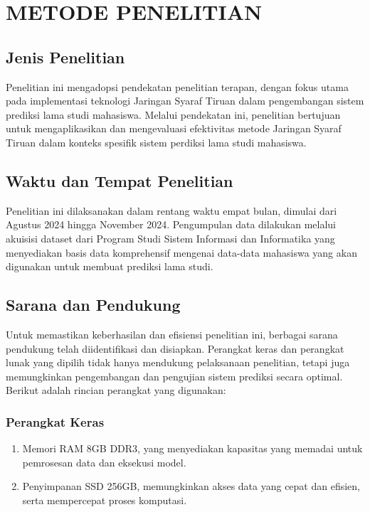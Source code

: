\chapter{METODE PENELITIAN}

\section{Jenis Penelitian}
Penelitian ini mengadopsi pendekatan penelitian terapan, dengan fokus utama pada implementasi teknologi Jaringan Syaraf Tiruan dalam pengembangan sistem prediksi lama studi mahasiswa. Melalui pendekatan ini, penelitian bertujuan untuk mengaplikasikan dan mengevaluasi efektivitas metode Jaringan Syaraf Tiruan dalam konteks spesifik sistem perdiksi lama studi mahasiswa.

\section{Waktu dan Tempat Penelitian}
Penelitian ini dilaksanakan dalam rentang waktu empat bulan, dimulai dari Agustus 2024 hingga November 2024. Pengumpulan data dilakukan melalui akuisisi dataset dari Program Studi Sistem Informasi dan Informatika yang menyediakan basis data komprehensif mengenai data-data mahasiswa yang akan digunakan untuk membuat prediksi lama studi.

\section{Sarana dan Pendukung}
Untuk memastikan keberhasilan dan efisiensi penelitian ini, berbagai sarana pendukung telah diidentifikasi dan disiapkan. Perangkat keras dan perangkat lunak yang dipilih tidak hanya mendukung pelaksanaan penelitian, tetapi juga memungkinkan pengembangan dan pengujian sistem prediksi secara optimal. Berikut adalah rincian perangkat yang digunakan:

\subsection{Perangkat Keras}
\begin{enumerate}
    \item Memori RAM 8GB DDR3, yang menyediakan kapasitas yang memadai untuk pemrosesan data dan eksekusi model.
    \item Penyimpanan SSD 256GB, memungkinkan akses data yang cepat dan efisien, serta mempercepat proses komputasi.
\end{enumerate}

